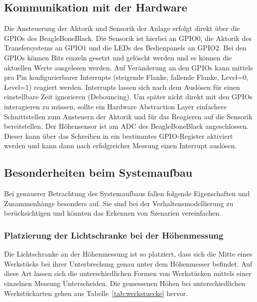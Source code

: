\subsection{Kommunikation mit der Hardware}

Die Ansteuerung der Aktorik und Sensorik der Anlage erfolgt direkt über die GPIOs des BeagleBoneBlack. 
Die Sensorik ist hierbei an GPIO0, die Aktorik des Transfersystems an GPIO1 und die LEDs des Bedienpanels an GPIO2.
Bei den GPIOs können Bits einzeln gesetzt und gelöscht werden und es können die aktuellen Werte ausgelesen werden.
Auf Veränderung an den GPIOs kann mittels pro Pin konfigurierbarer Interrupts (steigende Flanke, fallende Flanke, Level=0, Level=1) reagiert werden.
Interrupts lassen sich nach dem Auslösen für einen einstellbare Zeit ignorieren (Debouncing).
Um später nicht direkt mit den GPIOs interagieren zu müssen, sollte ein Hardware Abstraction Layer einfachere Schnittstellen zum Ansteuern der Aktorik und für das Reagieren auf die Sensorik bereitstellen.
Der Höhensensor ist am ADC des BeagleBoneBlack angeschlossen. Dieser kann über das Schreiben in ein bestimmtes GPIO-Register aktiviert werden und kann dann nach erfolgreicher Messung einen Interrupt auslösen.

\subsection{Besonderheiten beim Systemaufbau}

Bei genauerer Betrachtung des Systemaufbaus fallen folgende Eigenschaften und Zusammenhänge besonders auf. 
Sie sind bei der Verhaltensmodellierung zu berücksichtigen und könnten das Erkennen von Szenarien vereinfachen.

\subsubsection{Platzierung der Lichtschranke bei der Höhenmessung}

Die Lichtschranke an der Höhenmessung ist so platziert, dass sich die Mitte eines Werkstücks bei ihrer Unterbrechung genau unter dem Höhenmesser befindet. 
Auf diese Art lassen sich die unterschiedlichen Formen von Werkstücken mittels einer einzelnen Messung Unterscheiden. 
Die gemessenen Höhen bei unterschiedlichen Werkstückarten gehen aus Tabelle~\ref{tab:werkstuecke} hervor.

